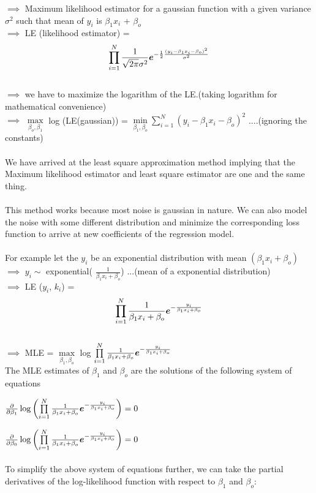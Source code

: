 \documentclass[12pt]{article}
\begin{document}
$\implies$ Maximum likelihood estimator for a gaussian function with a given variance $\sigma^2$ such that  mean of $y_i$ is $\beta_1$$x_i$ + $\beta_o$\\
$\implies$ LE (likelihood estimator) = $$   \prod\limits_{i=1}^{N} {\frac{1}{\sqrt{2\pi}\sigma^2} {\boldsymbol e}^{{-\frac{1}{2} \frac{(y_i-\beta_1 x_i - \beta_o)^2}{\sigma^2}}         }          }  $$                                               \\
$\implies$ we have to maximize the logarithm of the LE.(taking logarithm for mathematical convenience)  \\
$\implies$ $ \max\limits_{\beta_o,\beta_1}$ log (LE(gaussian)) = $\min\limits_{\beta_1,\beta_o} 
  \sum\limits_{i=1}^{N} (y_i-\beta_1 x_i - \beta_o)^2 $    \hfill ....(ignoring the constants)\\
  \\
We have arrived at the least square approximation method implying that the Maximum likelihood estimator and least square estimator are one and the same thing. \\
\\
This method works because most noise is gaussian in nature. We can also model the noise with some different distribution and minimize the corresponding loss function to arrive at new coefficients of the regression model.\\
\\
For example let the $y_i$ be an exponential distribution with mean $(\beta_1 x_i + \beta_o)$\\
$\implies$ $y_i \sim$  exponential( $\frac{1}{\beta_1x_i + \beta_o}$)    \hfill ...(mean of a exponential distribution)\\
$\implies$ LE ($y_i$, $k_i$) = $$  \prod\limits_{i=1}^{N} \frac{1}{\beta_1x_i + \beta_o} {\boldsymbol e}^{-\frac{y_i}{\beta_1x_i + \beta_o}}  $$\\
$\implies$ MLE = $\max\limits_{\beta_1,\beta_o}$ log $  \prod\limits_{i=1}^{N} \frac{1}{\beta_1x_i + \beta_o} {\boldsymbol e}^{-\frac{y_i}{\beta_1x_i + \beta_o}}  $ \\
The MLE estimates of $\beta_1$ and $\beta_o$ are the solutions of the following system of equations

$\frac{\partial}{\partial \beta_1} \log \left(\prod\limits_{i=1}^{N} \frac{1}{\beta_1x_i + \beta_o} {\boldsymbol e}^{-\frac{y_i}{\beta_1x_i + \beta_o}} \right) = 0$

$\frac{\partial}{\partial \beta_0} \log \left(\prod\limits_{i=1}^{N} \frac{1}{\beta_1x_i + \beta_o} {\boldsymbol e}^{-\frac{y_i}{\beta_1x_i + \beta_o}} \right) = 0$ \\
\\
To simplify the above system of equations further, we can take the partial derivatives of the log-likelihood function with respect to $\beta_1$ and $\beta_o$:
\end{document}

